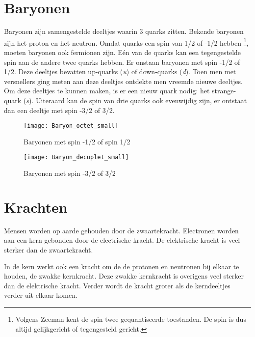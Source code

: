 \section{Baryonen}

Baryonen zijn samengestelde deeltjes waarin 3 quarks zitten. Bekende
baryonen zijn het proton en het neutron. Omdat quarks een spin van 1/2
of -1/2 hebben \footnote{Volgens Zeeman kent de spin twee gequantiseerde
toestanden. De spin is dus altijd gelijkgericht of tegengesteld
gericht.}, moeten baryonen ook fermionen zijn. Eén van de quarks kan een
tegengestelde spin aan de andere twee quarks hebben. Er onstaan baryonen
met spin -1/2 of 1/2. Deze deeltjes bevatten up-quarks (\emph{u}) of
down-quarks (\emph{d}). Toen men met versnellers ging meten aan deze
deeltjes ontdekte men vreemde nieuwe deeltjes. Om deze deeltjes te
kunnen maken, is er een nieuw quark nodig: het strange-quark (\emph{s}).
Uiteraard kan de spin van drie quarks ook evenwijdig zijn, er ontstaat
dan een deeltje met spin -3/2 of 3/2.

\begin{figure}[h]
\noindent \begin{centering}
\texttt{[image: Baryon\_octet\_small]}
\par\end{centering}

\caption{Baryonen met spin -1/2 of spin 1/2}
\end{figure}


\begin{figure}[H]
\noindent \begin{centering}
\texttt{[image: Baryon\_decuplet\_small]}
\par\end{centering}

\caption{Baryonen met spin -3/2 of 3/2}
\end{figure}


\section{Krachten}

Mensen worden op aarde gehouden door de zwaartekracht. Electronen
worden aan een kern gebonden door de electrische kracht. De elektrische
kracht is veel sterker dan de zwaartekracht. 

In de kern werkt ook een kracht om de de protonen en neutronen bij
elkaar te houden, de zwakke kernkracht. Deze zwakke kernkracht is
overigens veel sterker dan de elektrische kracht. Verder wordt de
kracht groter als de kerndeeltjes verder uit elkaar komen. 

